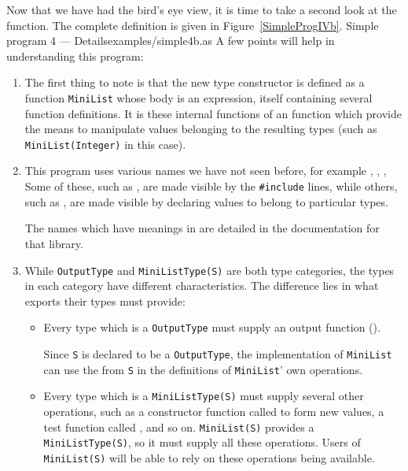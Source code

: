 Now that we have had the bird's eye view, 
it is time to take a second look at the function.   
The complete definition is given in Figure~\ref{SimpleProgIVb}.
{Simple program 4 --- Details}{examples/simple4b.as}
\clearpage
A few points will help in understanding this program:
\begin{enumerate}
\item 

The first thing to note is that the new type constructor is defined as
a function \verb"MiniList" whose body is an  expression,
itself containing several function definitions.  It is these internal
functions of an  function which provide the means to
manipulate values belonging to the resulting types (such as
\verb"MiniList(Integer)" in this case).

\item
This program uses various names we have not seen before,
for example , , , \etc{}
Some of these, such as ,
are made visible by the \verb"#include" lines,
while others, such as , are made visible by
declaring values to belong to particular types.

The names which have meanings in \libaldor{} are detailed in
the documentation for that library.

\item
While \verb"OutputType" and \verb"MiniListType(S)" are both
type categories, the types in each category have different characteristics.  
The difference lies in what exports their types must provide:

\begin{itemize}
\item
Every type which is a \verb"OutputType" must supply an
output function (\ttin{<<}).

Since \verb"S" is declared to be a \verb"OutputType",
the implementation of \verb"MiniList" can use
the \ttin{<<} from \verb"S"
in the definitions of \verb"MiniList"' own operations.

\item
Every type which is a \verb"MiniListType(S)" must supply 
several other operations, such as a constructor function called 
to form new values, a test function called , and so on.
\verb"MiniList(S)" provides a \verb"MiniListType(S)", so
it must supply all these operations.  
Users of \verb"MiniList(S)"
will be able to rely on these operations being available.
\end{itemize}


\end{enumerate}
